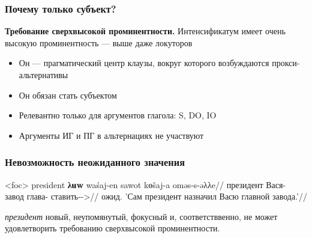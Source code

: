 \documentclass{beamer}
\begin{document}
        \begin{frame}
            \frametitle{Почему только субъект?}

            \textbf{Требование сверхвысокой проминентности.} Интенсификатум имеет очень высокую проминентность — выше даже локуторов
            
            \begin{itemize}
                \item Он — прагматический центр клаузы, вокруг которого возбуждаются прокси-альтернативы
                \item Он обязан стать субъектом
                \item Релевантно только для аргументов глагола: S, DO, IO
                \item Аргументы ИГ и ПГ в альтернациях не участвуют
            \end{itemize}
        \end{frame}

        

        \begin{frame}
            \frametitle{Невозможность неожиданного значения}
            
            \ex<foc>\begingl
            \gla\ljudge{*}president \textbf{λʉw} waśaj-en sawot kɵšaj-a oməs-s-əλλe//
            \glb президент \Int{} Вася-\Pssg{} завод глава-\Dat{} ставить-\Pst{}-\Tsg{}>\Sg{}//
            \glft ожид. 'Сам президент назначил Васю главной завода.'//
            \endgl
            \xe
        
            \textit{президент} новый, неупомянутый, фокусный и, соответстввенно, не может удовлетворить требованию сверхвысокой проминентности.
            
        \end{frame}

\end{document}

